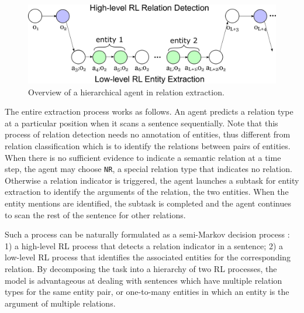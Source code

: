 \documentclass[letterpaper]{article} %
\theoremstyle{definition}
\begin{document}
\begin{figure}[!htp]
    \centering
    \includegraphics[width=\linewidth]{HRL.png}
    \caption{Overview of a hierarchical agent in relation extraction.} %
    \label{hierpolicy}
\end{figure}

The entire extraction process works as follows. An agent predicts a relation type at a particular position when it scans a sentence sequentially. Note that this process of relation detection needs no annotation of entities, thus different from relation classification which is to identify the relations between pairs of entities. When there is no sufficient evidence to indicate a semantic relation at a time step, the agent may choose \texttt{NR}, a special relation type that indicates no relation. Otherwise a relation indicator is triggered, the agent launches a subtask for entity extraction to identify the arguments of the relation, the two entities. When the entity mentions are identified, the subtask is completed and the agent continues to scan the rest of the sentence for other relations. 

Such a process can be naturally formulated as a semi-Markov decision process \cite{sutton1999between}: 1) a high-level RL process that detects a relation indicator in a sentence; 2) a low-level RL process that identifies the associated entities for the corresponding relation. 
By decomposing the task into a hierarchy of two RL processes, the model is advantageous at dealing with sentences which have multiple relation types for the same entity pair, or one-to-many entities in which an entity is the argument of multiple relations. 
\end{document}

